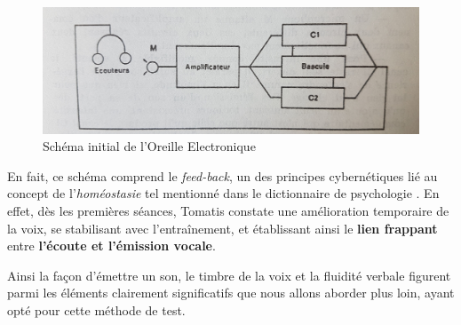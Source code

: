 \begin{figure}
	\centering
	\includegraphics[width=0.7\linewidth]{images/oreilleelectro.jpg}
	\caption[oreilleelectro]{Schéma initial de l'Oreille
          Electronique}

	\label{oreilleelectro}
\end{figure}
En fait, ce schéma comprend le\textit{ feed-back}, un des principes
cybernétiques lié au concept de l'\textit{homéostasie} tel
mentionné dans le dictionnaire de
psychologie \autocite[298]{doronparot}.
En effet, dès les premières
séances, Tomatis constate une amélioration temporaire de la voix, se
stabilisant avec l'entraînement, et établissant ainsi le
\textbf{lien frappant} entre\textbf{ l'écoute et
  l'émission vocale}.

Ainsi la façon d'émettre un son, le timbre de la voix et la fluidité
verbale figurent parmi les
éléments clairement significatifs que nous allons aborder plus loin, ayant opté pour
cette méthode de test.
